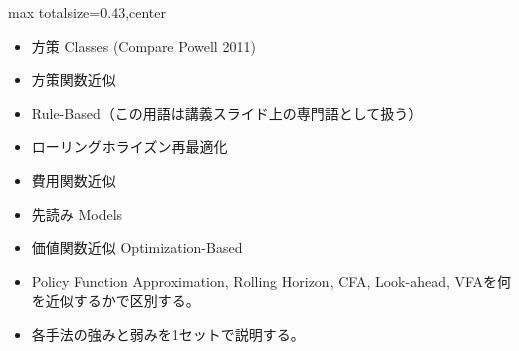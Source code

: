 \clearpage
{}
\begin{minipage}[t]{0.405\textwidth}
\begin{adjustbox}{max totalsize={\textwidth}{0.43\textheight},center}
\begin{minipage}{\textwidth}\scriptsize
{}\begin{itemize}
\item 方策 Classes (Compare Powell 2011)
\item 方策関数近似
\item Rule-Based（この用語は講義スライド上の専門語として扱う）
\item ローリングホライズン再最適化
\item 費用関数近似
\item 先読み Models
\item 価値関数近似 Optimization-Based
\end{itemize}\begin{itemize}
\item Policy Function Approximation, Rolling Horizon, CFA, Look-ahead, VFAを何を近似するかで区別する。
\item 各手法の強みと弱みを1セットで説明する。
\end{itemize}
\end{minipage}
\end{adjustbox}
\end{minipage}\hfill
